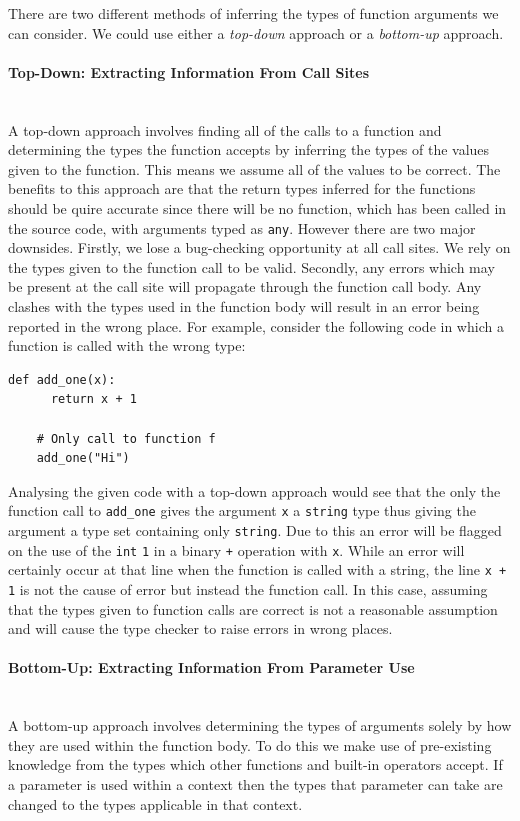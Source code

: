 \documentclass[12pt, titlepage]{article}
\begin{document}
There are two different methods of inferring the types of function arguments we can consider. We could use either a \textit{top-down} approach or a \textit{bottom-up} approach.

\paragraph*{Top-Down: Extracting Information From Call Sites}\mbox{} \\
A top-down approach involves finding all of the calls to a function and determining the types the function accepts by inferring the types of the values given to the function. This means we assume all of the values to be correct. The benefits to this approach are that the return types inferred for the functions should be quire accurate since there will be no function, which has been called in the source code, with arguments typed as \texttt{any}. However there are two major downsides. Firstly, we lose a bug-checking opportunity at all call sites. We rely on the types given to the function call to be valid. Secondly, any errors which may be present at the call site will propagate through the function call body. Any clashes with the types used in the function body will result in an error being reported in the wrong place. For example, consider the following code in which a function is called with the wrong type:
\begin{lstlisting}[mathescape]
    def add_one(x):
      return x + 1    	
    	
    # Only call to function f
    add_one("Hi")
\end{lstlisting}
Analysing the given code with a top-down approach would see that the only the function call to \texttt{add\_one} gives the argument \texttt{x} a \texttt{string} type thus giving the argument a type set containing only \texttt{string}. Due to this an error will be flagged on the use of the \texttt{int} \texttt{1} in a binary \texttt{+} operation with \texttt{x}. While an error will certainly occur at that line when the function is called with a string, the line \texttt{x + 1} is not the cause of error but instead the function call. In this case, assuming that the types given to function calls are correct is not a reasonable assumption and will cause the type checker to raise errors in wrong places.

\paragraph*{Bottom-Up: Extracting Information From Parameter Use}\mbox{} \\
A bottom-up approach involves determining the types of arguments solely by how they are used within the function body. To do this we make use of pre-existing knowledge from the types which other functions and built-in operators accept. If a parameter is used within a context then the types that parameter can take are changed to the types applicable in that context. \\
\end{document}
